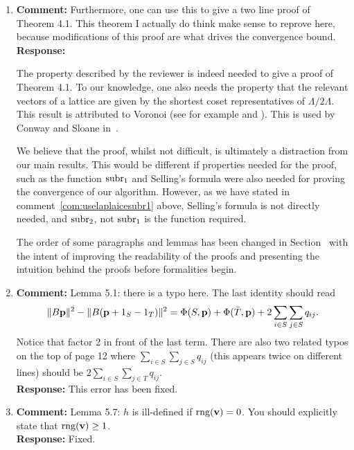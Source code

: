 \documentclass[a4paper,10pt]{article}
\begin{document}
\begin{enumerate}

\item\textbf{Comment:} \label{com:provethm4.1}
Furthermore, one can use this to give a two line proof of Theorem 4.1.  This theorem I actually do think make sense to reprove here, because modifications of this proof are what drives the convergence bound. 
\\\textbf{Response:}

The property described by the reviewer is indeed needed to give a proof of Theorem 4.1.  To our knowledge, one also needs the property that the relevant vectors of a lattice are given by the shortest coset representatives of $\Lambda / 2\Lambda$.  This result is attributed to Voronoi (see for example \cite[Theorem~2]{ConwaySloane1992_voronoi_lattice_3d_obtuse_superbases} and \cite[Theorem~3.2]{MicciancioVoulgaris_deterministic_jv_2013}).  This is used by Conway and Sloane in~\cite[Theorem~3]{ConwaySloane1992_voronoi_lattice_3d_obtuse_superbases}.

We believe that the proof, whilst not difficult, is ultimately a distraction from our main results.  This would be different if properties needed for the proof, such as the function $\operatorname{subr}_1$ and Selling's formula were also needed for proving the convergence of our algorithm.  However, as we have stated in comment~\ref{com:uselaplaicesubr1} above, Selling's formula is not directly needed, and $\operatorname{subr}_2$, not $\operatorname{subr}_1$ is the function required. 

The order of some paragraphs and lemmas has been changed in Section~ with the intent of improving the readability of the proofs and presenting the intuition behind the proofs before formalities begin.

\item\textbf{Comment:} 
Lemma 5.1: there is a typo here.  The last identity should read
\[
\|B\mathbf{p}\|^2 - \|B(\mathbf{p} + 1_S - 1_T)\|^2 = \Phi(S,\mathbf{p}) + \Phi(\bar{T}, \mathbf{p}) + 2\sum_{i \in S}\sum_{j\in S} q_{ij}.
\]
Notice that factor 2 in front of the last term.  There are also two related typos on the top of page 12 where $\sum_{i \in S}\sum_{j\in S} q_{ij}$ (this appears twice on different lines) should be $2\sum_{i \in S}\sum_{j\in T} q_{ij}$.
\\\textbf{Response:}
This error has been fixed.


\item\textbf{Comment:} 
Lemma 5.7: $h$ is ill-defined if $\operatorname{rng}(\mathbf{v}) = 0$.  You should explicitly state that $\operatorname{rng}(\mathbf{v}) \geq 1$.
\\\textbf{Response:}
Fixed.


\end{enumerate}
\end{document}

